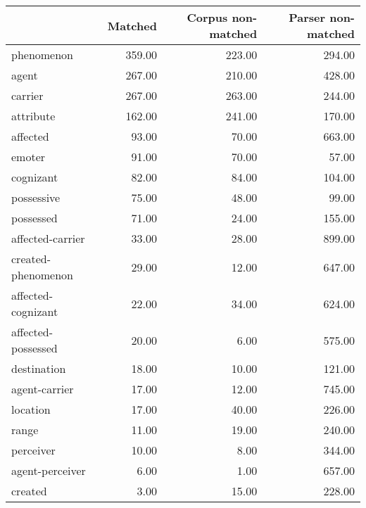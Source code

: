 \begin{table}[!ht]
\centering
\begin{tabular}{lrrr}
\toprule
{} &  Matched &  Corpus non-matched &  Parser non-matched \\
\midrule
phenomenon           &   359.00 &              223.00 &              294.00 \\
agent                &   267.00 &              210.00 &              428.00 \\
carrier              &   267.00 &              263.00 &              244.00 \\
attribute            &   162.00 &              241.00 &              170.00 \\
affected             &    93.00 &               70.00 &              663.00 \\
emoter               &    91.00 &               70.00 &               57.00 \\
cognizant            &    82.00 &               84.00 &              104.00 \\
possessive           &    75.00 &               48.00 &               99.00 \\
possessed            &    71.00 &               24.00 &              155.00 \\
affected-carrier     &    33.00 &               28.00 &              899.00 \\
created-phenomenon   &    29.00 &               12.00 &              647.00 \\
affected-cognizant   &    22.00 &               34.00 &              624.00 \\
affected-possessed   &    20.00 &                6.00 &              575.00 \\
destination          &    18.00 &               10.00 &              121.00 \\
agent-carrier        &    17.00 &               12.00 &              745.00 \\
location             &    17.00 &               40.00 &              226.00 \\
range                &    11.00 &               19.00 &              240.00 \\
perceiver            &    10.00 &                8.00 &              344.00 \\
agent-perceiver      &     6.00 &                1.00 &              657.00 \\
created              &     3.00 &               15.00 &              228.00 \\

\end{tabular}
\end{table}
